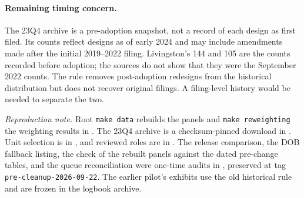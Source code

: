 \paragraph{Remaining timing concern.}
The 23Q4 archive is a pre-adoption snapshot, not a record of each design as
first filed. Its counts reflect designs as of early 2024 and may include
amendments made after the initial 2019--2022 filing. Livingston's 144 and 105
are the counts recorded before adoption; the sources do not show that they
were the September 2022 counts. The rule removes post-adoption redesigns from
the historical distribution but does not recover original filings. A
filing-level history would be needed to separate the two.

\textit{Reproduction note.} Root \texttt{make data} rebuilds the panels and
\texttt{make reweighting} the weighting results in
. The 23Q4 archive is a
checksum-pinned download in . Unit
selection is in , and reviewed roles are
in . The release comparison, the DOB
fallback listing, the check of the rebuilt panels against the dated pre-change
tables, and the queue reconciliation were one-time audits in
, preserved at tag
\texttt{pre-cleanup-2026-09-22}. The earlier pilot's exhibits use the old
historical rule and are frozen in the logbook archive.
